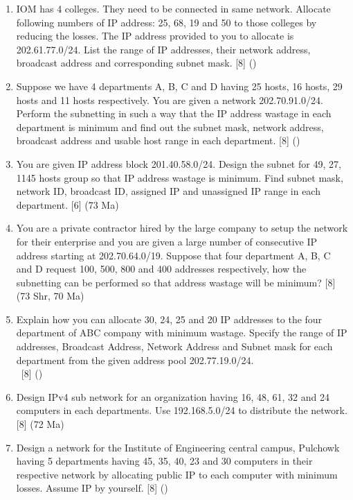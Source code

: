 \documentclass[12pt]{article}
\newcommand{\enter}{\\\textcolor{white}{1}}
\begin{document}
\begin{enumerate}
			\item IOM has 4 colleges. They need to be connected in same network. Allocate following numbers of IP address: 25, 68, 19 and 50 to those colleges by reducing the losses. The IP address provided to you to allocate is 202.61.77.0/24. List the range of IP addresses, their network address, broadcast address and corresponding subnet mask. \hfill [8] ()

			\item Suppose we have 4 departments A, B, C and D having 25 hosts, 16 hosts, 29 hosts and 11 hosts respectively. You are given a network 202.70.91.0/24. Perform the subnetting in such a way that the IP address wastage in each department is minimum and find out the subnet mask, network address, broadcast address and usable host range in each department. \hfill [8] ()

			\item You are given IP address block 201.40.58.0/24. Design the subnet for 49, 27, 1145 hosts group so that IP address wastage is minimum. Find subnet mask, network ID, broadcast ID, assigned IP and unassigned IP range in each department. \hfill [6] (73 Ma)

			\item You are a private contractor hired by the large company to setup the network for their enterprise and you are given a large number of consecutive IP address starting at 202.70.64.0/19. Suppose that four department A, B, C and D request 100, 500, 800 and 400 addresses respectively, how the subnetting can be performed so that address wastage will be minimum? \hfill [8] (73 Shr, 70 Ma)

			\item Explain how you can allocate 30, 24, 25 and 20 IP addresses to the four department of ABC company with minimum wastage. Specify the range of IP addresses, Broadcast Address, Network Address and Subnet mask for each department from the given address pool 202.77.19.0/24.
			\enter\hfill [8] ()

			\item Design IPv4 sub network for an organization having 16, 48, 61, 32 and 24 computers in each departments. Use 192.168.5.0/24 to distribute the network. \hfill [8] (72 Ma)

			\item Design a network for the Institute of Engineering central campus, Pulchowk having 5 departments having 45, 35, 40, 23 and 30 computers in their respective network by allocating public IP to each computer with minimum losses. Assume IP by yourself. \hfill [8] ()


\end{enumerate}
\end{document}
